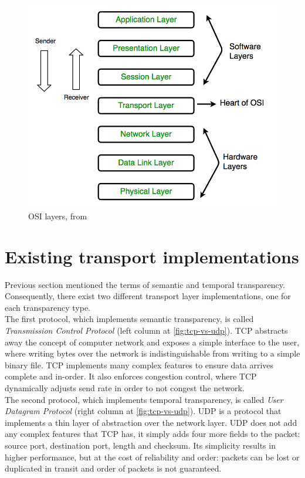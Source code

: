 \documentclass[times, utf8, diplomski]{fer}
\begin{document}
\begin{figure}[h!]
	\centering
	\includegraphics[scale=0.34]{OSI-model-layers}
	\caption{OSI layers, from \cite{GeeksForGeeks:OSI-model}}
	\label{fig:osi-layers}
\end{figure}


\section{Existing transport implementations}
Previous section mentioned the terms of semantic and temporal transparency. Consequently, there exist two different transport layer implementations, one for each transparency type. \\

The first protocol, which implements semantic transparency, is called \textit{Transmission Control Protocol} \cite{rfc793} (left column at \ref{fig:tcp-vs-udp}). TCP abstracts away the concept of computer network and exposes a simple interface to the user, where writing bytes over the network is indistinguishable from writing to a simple binary file. TCP implements many complex features to ensure data arrives complete and in-order. It also enforces congestion control, where TCP dynamically adjusts send rate in order to not congest the network. \\

The second protocol, which implements temporal transparency, is called \textit{User Datagram Protocol} \cite{rfc768} (right column at \ref{fig:tcp-vs-udp}). UDP is a protocol that implements a thin layer of abstraction over the network layer. UDP does not add any complex features that TCP has, it simply adds four more fields to the packet: source port, destination port, length and checksum. Its simplicity results in higher performance, but at the cost of reliability and order: packets can be lost or duplicated in transit and order of packets is not guaranteed.\\
\end{document}
